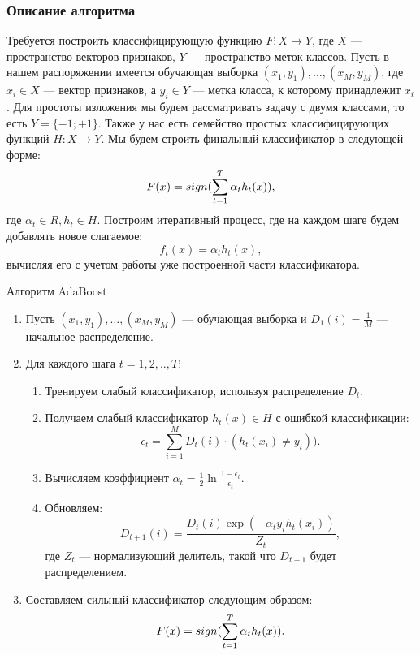 \subsubsection{Описание алгоритма}
Требуется построить классифицирующую функцию $F : X \to Y$, где $X$ --- пространство векторов признаков, $Y$ --- пространство меток классов. Пусть в нашем распоряжении имеется обучающая выборка $(x_1, y_1), \dots, (x_M, y_M)$, где $x_i \in X$ --- вектор признаков, а $y_i \in Y$ --- метка класса, к которому принадлежит $x_i$. Для простоты изложения мы будем рассматривать задачу с двумя классами, то есть $Y = \{-1; +1\}$. Также у нас есть семейство простых классифицирующих функций $H: X \to Y$. Мы будем строить финальный классификатор в следующей форме:
\begin{displaymath}
  F(x) = sign(\sum_{t = 1}^T{\alpha_th_t(x)}),
\end{displaymath}
где $\alpha_t \in R, h_t \in H.$ Построим итеративный процесс, где на каждом шаге будем добавлять новое слагаемое:
\begin{displaymath}
  f_t(x) = \alpha_th_t(x),
\end{displaymath}
вычисляя его с учетом работы уже построенной части классификатора.

\begin{algorithm}
  \caption{Алгоритм AdaBoost}
  \label{adaboost-algorithm}
  \begin{enumerate}
  \item Пусть $(x_1, y_1), \dots, (x_M, y_M)$ --- обучающая выборка и $D_1(i) = \frac{1}{M}$ --- начальное распределение.
  \item Для каждого шага $t = 1,2,..,T$:
    \begin{enumerate}
      \item Тренируем слабый классификатор, используя распределение $D_t$.
      \item Получаем слабый классификатор $h_t(x) \in H$ с ошибкой классификации:
        \begin{displaymath}
          \epsilon_t = \sum_{i = 1}^M{D_t(i) \cdot (h_t(x_i) \neq y_i)}).
        \end{displaymath}
      \item Вычисляем коэффициент $\alpha_t = \frac{1}{2}\ln{\frac{1 - \epsilon_t}{\epsilon_t}}$.
      \item Обновляем:
        \begin{displaymath}
          D_{t + 1}(i) = \frac{D_t(i)\exp{(-\alpha_ty_ih_t(x_i))}}{Z_t},
        \end{displaymath}
        где $Z_t$ --- нормализующий делитель, такой что $D_{t + 1}$ будет распределением.
    \end{enumerate}
  \item Составляем сильный классификатор следующим образом:
    \begin{displaymath}
      F(x) = sign(\sum_{t = 1}^T{\alpha_th_t(x)}).
    \end{displaymath}
  \end{enumerate}
\end{algorithm}

